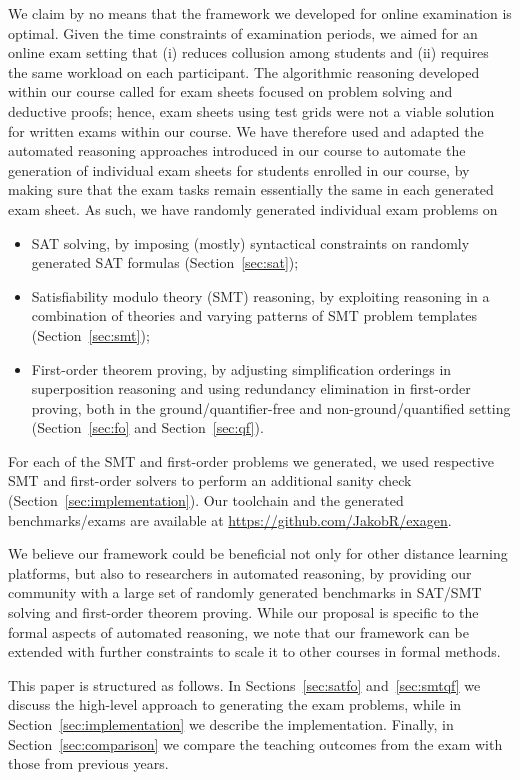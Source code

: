 We claim by no means that the framework we developed for online
examination is optimal.
Given the time constraints of examination periods, we aimed for an
online exam setting that (i) reduces collusion among students and  (ii)
requires the same workload on each participant.
The algorithmic reasoning developed within our
course called for exam sheets focused on problem solving and deductive
proofs; hence, exam sheets using test grids were not a viable solution
for written exams within our course.
We have therefore used and adapted the automated reasoning approaches introduced in our
course to automate the generation of individual exam sheets for
students enrolled in our course, by making sure that the exam tasks
remain essentially the same in each generated exam sheet. As such, we have randomly generated
individual exam problems on 
\begin{itemize}
\item
    SAT solving, by imposing (mostly) syntactical constraints on
    randomly generated SAT formulas (Section~\ref{sec:sat});
\item Satisfiability modulo theory (SMT) reasoning, by exploiting reasoning in a combination of theories
  and varying patterns of SMT problem templates (Section~\ref{sec:smt}); 
\item First-order theorem proving, by adjusting simplification
  orderings in superposition reasoning and using redundancy elimination
  in first-order proving, both in the ground/quantifier-free 
  and non-ground/quantified setting (Section~\ref{sec:fo}
  and Section~\ref{sec:qf}). 
\end{itemize}
For each of the SMT and first-order problems we generated, we used respective
SMT and first-order solvers to perform an additional sanity check
(Section~\ref{sec:implementation}).
Our toolchain and the generated benchmarks/exams are available at \url{https://github.com/JakobR/exagen}.

We believe our framework could be beneficial not only for other
distance learning platforms, but also to researchers in automated
reasoning, by providing our community with a large set of randomly generated benchmarks in SAT/SMT solving and first-order theorem proving.
While our proposal is specific to the formal aspects of automated
reasoning, we note that  our framework can be extended with further
constraints to scale it to other courses in formal methods. 

This paper is structured as follows. In Sections~\ref{sec:satfo} and~\ref{sec:smtqf}
we discuss the high-level approach to generating the exam problems,
while in Section~\ref{sec:implementation}
we describe the implementation. Finally, in Section~\ref{sec:comparison} we compare
the teaching outcomes from the exam with those from previous years.
